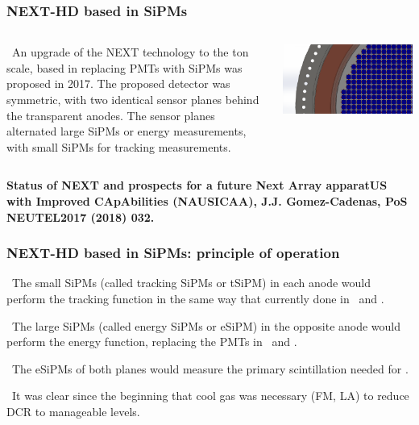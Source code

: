 \begin{frame}
\frametitle{NEXT-HD based in SiPMs}

\begin{columns}

\blt\ An upgrade of the NEXT technology to the ton scale, based in replacing PMTs with SiPMs was proposed in 2017. The proposed detector was symmetric, with two identical sensor planes behind the transparent anodes. The sensor planes alternated large SiPMs or energy measurements, with small SiPMs for tracking measurements. 

\includegraphics[scale=0.13]{img/n2-sector.png}

\end{columns}

\vspace{1cm}
{\fontsize{6pt}{7.2}\selectfont \bf Status of NEXT and prospects for a future Next Array apparatUS with Improved CApAbilities (NAUSICAA), J.J.  Gomez-Cadenas, PoS NEUTEL2017 (2018) 032.}
\end{frame}

\begin{frame}
\frametitle{NEXT-HD based in SiPMs: principle of operation}

\blt\ The small SiPMs (called tracking SiPMs or tSiPM) in each anode would perform the tracking function in the same way that currently done in \New\ and \Next.

\blt\ The large SiPMs (called energy SiPMs or eSiPM) in the opposite anode would perform the energy function, replacing the PMTs in \New\ and \Next.

\blt\ The eSiPMs of both planes would measure the primary scintillation needed for \tz.

\blt\ It was clear since the beginning that cool gas was necessary (FM, LA) to reduce DCR to manageable levels. 
\end{frame}

